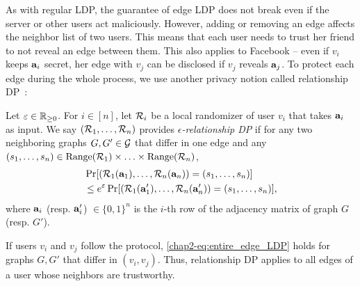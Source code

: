 As with regular LDP, the guarantee of edge LDP does not break 
even if 
the server or other users act maliciously. 
However, 
adding or removing an edge
affects the neighbor list of two users. 
This means that each user needs to trust 
her friend 
to not reveal 
an edge between them. 
This also applies to Facebook -- even if $v_i$ keeps $\mathbf{a}_i$ secret, her edge with $v_j$ can be disclosed if $v_j$ reveals $\mathbf{a}_j$. 
To protect each edge during the whole process, 
we use 
another 
privacy notion 
called relationship DP~\cite{Imola_USENIX21}:

\begin{definition}  
\label{chap2-def:entire_edge_LDP} 
  Let $\varepsilon \in \mathbb{R}_{\ge0}$. For 
  $i \in [n]$, 
  let $\mathcal{R}_i$ be a 
  local randomizer of user $v_i$ that 
  takes $\mathbf{a}_i$ as input. We say 
  $(\mathcal{R}_1, \ldots, \mathcal{R}_n)$ provides 
\emph{$\epsilon$-relationship DP} 
if for any two neighboring graphs $G, G' \in \mathcal{G}$ that differ in one edge and 
  any $(s_1, \ldots, s_n) \in \mathrm{Range}(\mathcal{R}_1) \times \ldots \times \mathrm{Range}(\mathcal{R}_n)$, 
\begin{align}
  &\Pr[(\mathcal{R}_1(\mathbf{a}_1), \ldots, \mathcal{R}_n(\mathbf{a}_n)) = (s_1, \ldots, s_n)] \nonumber\\
  &\leq e^\varepsilon \Pr[(\mathcal{R}_1(\mathbf{a}'_1), \ldots, \mathcal{R}_n(\mathbf{a}'_n)) = (s_1,
  \ldots, s_n)],
\label{chap2-eq:entire_edge_LDP}
\end{align}
  where $\mathbf{a}_i$ (resp. $\mathbf{a}_i'$) $\in \{0,1\}^n$ is the $i$-th row of the
  adjacency matrix of graph $G$ (resp. $G'$).
\end{definition}
If 
users $v_i$ and $v_j$ follow the protocol, 
\eqref{chap2-eq:entire_edge_LDP} holds for graphs $G,G'$ that differ 
in $(v_i, v_j)$. 
Thus, 
relationship DP applies to
all edges of a user 
whose 
neighbors are 
trustworthy.

